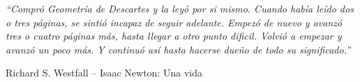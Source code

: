 \documentclass[a4paper,11pt,twoside]{book}
\begin{document}


\clearpage\thispagestyle{empty}\mbox{}\clearpage

\vspace*{0.2\textheight}

{\large \textit{ {\huge ``}Compr\'o Geometr\'ia de Descartes y la ley\'o por si mismo.
Cuando hab\'ia le\'ido dos o tres p\'aginas, se sinti\'o incapaz de seguir
adelante. Empez\'o de nuevo y avanz\'o tres o cuatro p\'aginas m\'as, hasta
llegar a otro punto dificil. Volvi\'o a empezar y avanz\'o un poco m\'as. Y
continu\'o as\'i hasta hacerse dueño de todo su significado.{\huge ''}}}
\begin{flushright}
  Richard S. Westfall -- Isaac Newton: Una vida
\end{flushright}

\clearpage\thispagestyle{empty}\mbox{}\clearpage





\tableofcontents
\listoffigures

\mainmatter %
\pagestyle{fancy} %



%




\begin{appendices}
    
\end{appendices}



\end{document}
